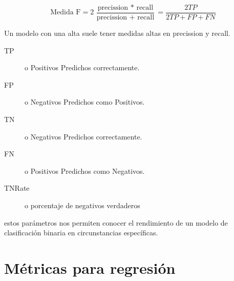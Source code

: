 $$\text{Medida F} = 2\,\frac{\text{precission }\ast \text{ recall}}{\text{precission }+ \text{ recall}} = \frac{2TP}{2TP + FP + FN}$$

Un modelo con una  alta suele tener medidas altas en precission y recall.

\begin{description}
    \item[TP] o Positivos Predichos correctamente.
    \item[FP]  o Negativos Predichos como Positivos.
    \item[TN] o Negativos Predichos correctamente. 
    \item[FN] o Positivos Predichos como Negativos.  
    \item[TNRate] o porcentaje de negativos verdaderos 
\end{description}
estos parámetros nos permiten conocer el rendimiento de un modelo de clasificación binaria en circunstancias específicas.

\section{Métricas para regresión}

